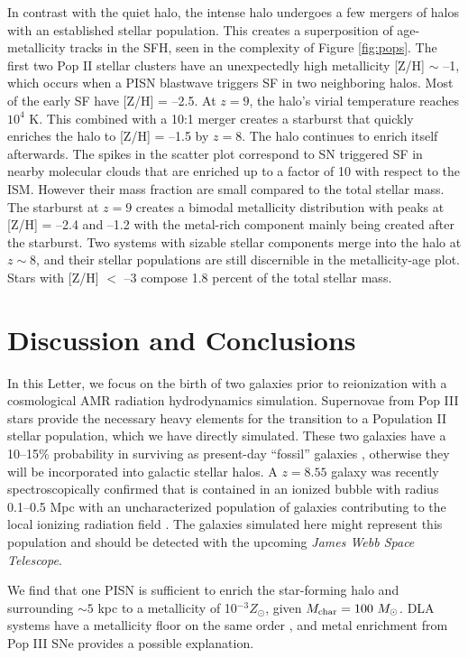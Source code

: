 \documentclass[apjl]{emulateapj}
\newcommand{\Ms}{\ifmmode{M_\odot}\else{$M_\odot$}\fi}
\newcommand\tento[1]{$10^{#1}$}
\begin{document}
In contrast with the quiet halo, the intense halo undergoes a few
mergers of halos with an established stellar population.  This creates
a superposition of age-metallicity tracks in the SFH, seen in the
complexity of Figure \ref{fig:pops}.  The first two Pop II stellar
clusters have an unexpectedly high metallicity [Z/H] $\sim$ --1, which
occurs when a PISN blastwave triggers SF in two neighboring halos.
Most of the early SF have [Z/H] = --2.5.  At $z=9$, the halo's virial
temperature reaches \tento{4} K.  This combined with a 10:1 merger
creates a starburst that quickly enriches the halo to [Z/H] = --1.5 by
$z=8$.  The halo continues to enrich itself afterwards.  The spikes in
the scatter plot correspond to SN triggered SF in nearby molecular
clouds that are enriched up to a factor of 10 with respect to the ISM.
However their mass fraction are small compared to the total stellar
mass.  The starburst at $z=9$ creates a bimodal metallicity
distribution with peaks at [Z/H] = --2.4 and --1.2 with the metal-rich
component mainly being created after the starburst.  Two systems with
sizable stellar components merge into the halo at $z \sim 8$, and
their stellar populations are still discernible in the metallicity-age
plot.  Stars with [Z/H] $<$ --3 compose 1.8 percent of the total
stellar mass.

\section{Discussion and Conclusions}

In this Letter, we focus on the birth of two galaxies prior to
reionization with a cosmological AMR radiation hydrodynamics
simulation.  Supernovae from Pop III stars provide the necessary heavy
elements for the transition to a Population II stellar population,
which we have directly simulated.  These two galaxies have a 10--15\%
probability in surviving as present-day ``fossil'' galaxies
\citep{Gnedin06}, otherwise they will be incorporated into galactic
stellar halos.  A $z=8.55$ galaxy was recently spectroscopically
confirmed that is contained in an ionized bubble with radius 0.1--0.5
Mpc with an uncharacterized population of galaxies contributing to the
local ionizing radiation field \citep{Lehnert10_z8.6}.  The galaxies
simulated here might represent this population and should be detected
with the upcoming \textit{James Webb Space Telescope}.

We find that one PISN is sufficient to enrich the star-forming halo
and surrounding $\sim 5$ kpc to a metallicity of 10$^{-3} Z_\odot$,
given $M_{\rm char} = 100~\Ms$.  DLA systems have a metallicity floor
on the same order \citep{Wolfe05_Review}, and metal enrichment from Pop
III SNe provides a possible explanation.
\end{document}
